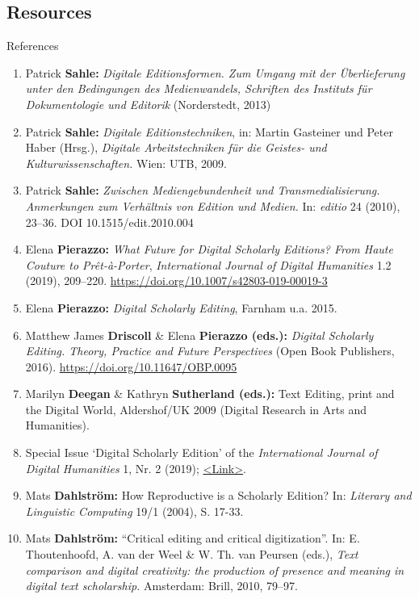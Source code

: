\subsection{Resources}
\begin{frame}[allowframebreaks]{References}
\begin{enumerate}\footnotesize
    \item Patrick \textbf{Sahle:} \emph{Digitale Editionsformen. Zum Umgang mit der Überlieferung unter den Bedingungen des Medienwandels, Schriften des Instituts für Dokumentologie und Editorik} (Norderstedt, 2013)
    \item Patrick \textbf{Sahle:} \emph{Digitale Editionstechniken}, in: Martin Gasteiner und Peter Haber (Hrsg.), \emph{Digitale Arbeitstechniken für die Geistes- und Kulturwissenschaften.} Wien: UTB, 2009.
    \item Patrick \textbf{Sahle:} \emph{Zwischen Mediengebundenheit und Transmedialisierung. Anmerkungen zum Verhältnis von Edition und Medien.} In: \emph{editio} 24 (2010), 23--36. DOI 10.1515/edit.2010.004
    \item Elena \textbf{Pierazzo:} \emph{What Future for Digital Scholarly Editions? From Haute Couture to Prêt-à-Porter}, \emph{International Journal of Digital Humanities} 1.2 (2019), 209--220. \protect\url{https://doi.org/10.1007/s42803-019-00019-3}
    \item Elena \textbf{Pierazzo:} \emph{Digital Scholarly Editing}, Farnham u.a. 2015.
    \item Matthew James \textbf{Driscoll} \& Elena \textbf{Pierazzo (eds.):} \emph{Digital Scholarly Editing. Theory, Practice and Future Perspectives} (Open Book Publishers, 2016). \protect\url{https://doi.org/10.11647/OBP.0095}
    \item Marilyn \textbf{Deegan} \& Kathryn \textbf{Sutherland (eds.):} Text Editing, print and the Digital World, Aldershof/UK 2009 (Digital Research in Arts and Humanities).
    \item Special Issue `Digital Scholarly Edition' of the \emph{International Journal of Digital Humanities} 1, Nr. 2 (2019); \href{https://link.springer.com/journal/42803/topicalCollection/AC_00bb5c504ba4a0bbaa9dc32f1881a986}{<Link>}.
    \item Mats \textbf{Dahlström:} How Reproductive is a Scholarly Edition? In: \emph{Literary and Linguistic Computing} 19/1 (2004), S. 17-33. 
    \item Mats \textbf{Dahlström:} ``Critical editing and critical digitization''. In: E. Thoutenhoofd, A. van der Weel \& W. Th. van Peursen (eds.), \emph{Text comparison and digital creativity: the production of presence and meaning in digital text scholarship.} Amsterdam: Brill, 2010, 79--97.

\end{enumerate}
\end{frame}
